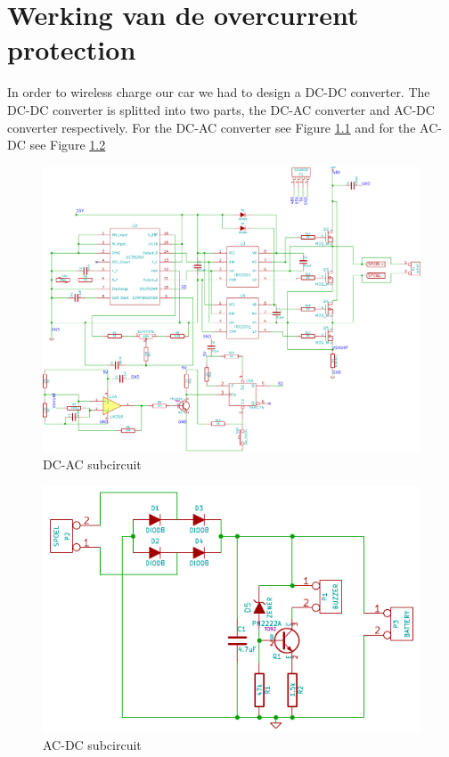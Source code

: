 \documentclass[final]{scrreprt} %
\begin{document}
\chapter{Werking van de overcurrent protection}
In order to wireless charge our car we had to design a DC-DC converter. The DC-DC converter is splitted into two parts, the DC-AC converter and AC-DC converter respectively. 
For the DC-AC converter see Figure \ref{fig:DC-AC} and for the AC-DC see Figure \ref{fig:AC-DC}

\begin{figure}[h]
	\includegraphics[width=\linewidth]{resources/DC-AC-rc.pdf}
	\caption{DC-AC subcircuit}
	\label{fig:DC-AC}
\end{figure}

\begin{figure}[h]
	\includegraphics[width=\linewidth]{resources/AC-DC-rc.pdf}
	\caption{AC-DC subcircuit}
	\label{fig:AC-DC}
\end{figure}
\end{document}
